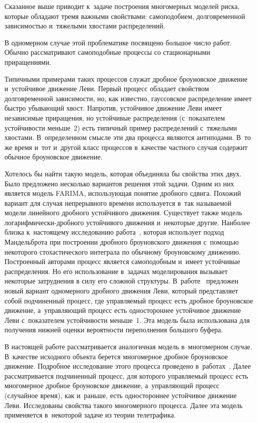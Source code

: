 \begin{multicols}{2}
Сказанное выше приводит к~задаче построения многомерных моделей
риска, которые обладают тремя важными свойствами: самоподобием,
долговременной зависимостью и~тяжелыми хвостами распределений.

В одномерном случае этой проблематике посвящено большое число работ.
Обычно рассматривают самоподобные процессы со стационарными
приращениями. 

Типичными примерами таких процессов служат дробное
броуновское движение и~устойчивое движение Леви. Первый процесс
обладает свойством долговременной зависимости, но, как известно,
гауссовское распределение имеет быстро убывающий хвост. Напротив,
устойчивое движение Леви имеет независимые приращения, но устойчивые
распределения (с~показателем устойчивости меньше~2) есть типичный
пример распределений с~тяжелыми хвостами. В~определенном смысле эти
два процесса являются антиподами. В~то же время и~тот и~другой класс
процессов в~качестве частного случая содержит обычное броуновское
движение. 

Хотелось бы найти такую модель, которая объединяла бы
свойства этих двух.  Было предложено несколько вариантов решения
этой задачи. Одним из них является модель FARIMA, использующая
понятие дробного сдвига. Похожий вариант для случая непрерывного
времени используется в~так называемой модели линейного дробного
устойчивого движения. Существует также модель
ло\-га\-риф\-ми\-че\-ски-дроб\-но\-го устойчивого движения и~некоторые другие.
Наиболее близка к~настоящему исследованию работа~\cite{Las02},
которая использует подход Мандельброта при построении дробного
броуновского движения с~помощью некоторого стохастического интеграла
по обычному броуновскому движению. Построенный авторами процесс
является самоподобным и~имеет устойчивые распределения. Но его
использование в~задачах моделирования вызывает некоторые затруднения
в силу его сложной структуры. В~работе~\cite{Ni12} предложен новый
вариант одномерного дробного движения Леви, который представляет
собой подчиненный  процесс, где управляемый процесс есть дробное
броуновское движение, а~управляющий процесс есть одностороннее
устойчивое движение Леви с~показателем устойчивости меньше~1. Эта
модель была использована для получения нижней оценки вероятности
переполнения большого буфера.

В настоящей работе рассматривается аналогичная модель в~многомерном
случае. В~качестве исходного объекта берется многомерное дробное
броуновское движение. Подробное исследование этого процесса
проведено в~работах~\cite{Sto06, Amb12}. Далее
рассматривается подчиненный процесс, для которого управляемый
процесс есть многомерное дробное броуновское движение, а~управляющий
процесс (случайное время), как и~раньше, есть одностороннее
устойчивое движение Леви. Исследованы свойства такого многомерного
процесса. Далее эта модель применяется в~некоторой задаче из теории
телетрафика.


\end{multicols}
